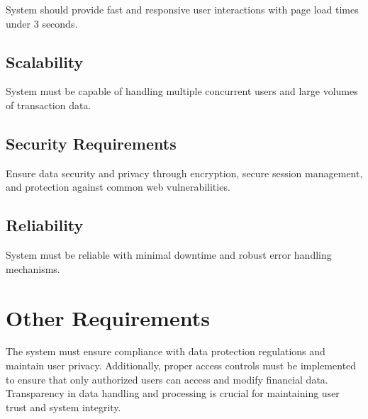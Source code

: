 System should provide fast and responsive user interactions with page load times under 3 seconds.

\subsection{Scalability}

System must be capable of handling multiple concurrent users and large volumes of transaction data.

\subsection{Security Requirements}

Ensure data security and privacy through encryption, secure session management, and protection against common web vulnerabilities.

\subsection{Reliability}

System must be reliable with minimal downtime and robust error handling mechanisms.

\section{Other Requirements}

The system must ensure compliance with data protection regulations and maintain user privacy. Additionally, proper access controls must be implemented to ensure that only authorized users can access and modify financial data. Transparency in data handling and processing is crucial for maintaining user trust and system integrity.